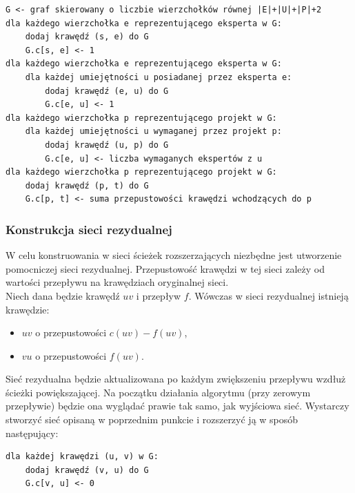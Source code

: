 \documentclass[12pt,a4paper]{article}
\theoremstyle{definition}
\begin{document}
\begin{tcolorbox}[title=Konstrukcja sieci podstawowej]
\begin{verbatim}
G <- graf skierowany o liczbie wierzchołków równej |E|+|U|+|P|+2
dla każdego wierzchołka e reprezentującego eksperta w G:
    dodaj krawędź (s, e) do G
    G.c[s, e] <- 1
dla każdego wierzchołka e reprezentującego eksperta w G:
    dla każdej umiejętności u posiadanej przez eksperta e:
        dodaj krawędź (e, u) do G
        G.c[e, u] <- 1
dla każdego wierzchołka p reprezentującego projekt w G:
    dla każdej umiejętności u wymaganej przez projekt p:
        dodaj krawędź (u, p) do G
        G.c[e, u] <- liczba wymaganych ekspertów z u
dla każdego wierzchołka p reprezentującego projekt w G:
    dodaj krawędź (p, t) do G
    G.c[p, t] <- suma przepustowości krawędzi wchodzących do p
\end{verbatim}
\end{tcolorbox}

\subsubsection{Konstrukcja sieci rezydualnej}
W celu konstruowania w sieci ścieżek rozszerzających niezbędne jest utworzenie pomocniczej sieci rezydualnej. Przepustowość krawędzi w tej sieci zależy od wartości przepływu na krawędziach oryginalnej sieci.\\

\noindent
Niech dana będzie krawędź $uv$ i przepływ $f$. Wówczas w sieci rezydualnej istnieją krawędzie:
\begin{itemize}
	\item $uv$ o przepustowości $c(uv) - f(uv)$,
	\item $vu$ o przepustowości $f(uv)$.\\
\end{itemize}

\noindent
Sieć rezydualna będzie aktualizowana po każdym zwiększeniu przepływu wzdłuż ścieżki powiększającej. Na początku działania algorytmu (przy zerowym przepływie) będzie ona wyglądać prawie tak samo, jak wyjściowa sieć. Wystarczy stworzyć sieć opisaną w poprzednim punkcie i rozszerzyć ją w sposób następujący:\\

\begin{tcolorbox}[title=Rozszerzenie konstrukcji sieci podstawowej]
\begin{verbatim}
dla każdej krawędzi (u, v) w G:
    dodaj krawędź (v, u) do G
    G.c[v, u] <- 0
\end{verbatim}
\end{tcolorbox}
\end{document}
